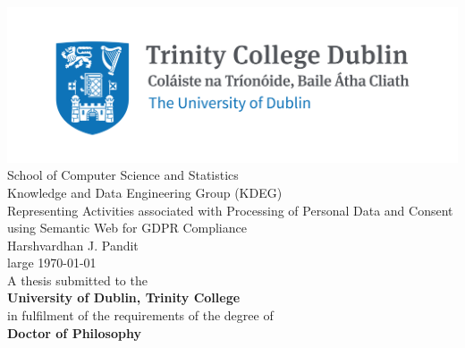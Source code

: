 \pagestyle{empty}
\begin{center}
\includegraphics{img/TCD_logo.png}\\[1cm] 
\Large School of Computer Science and Statistics \\
\large Knowledge and Data Engineering Group (KDEG) \\[1.5cm]

\huge Representing Activities associated with Processing of Personal Data and Consent using Semantic Web for GDPR Compliance \\[1.5cm]
 
\Large Harshvardhan J. Pandit \\[2cm]

{large \today}\\[2cm] %

\normalsize
A thesis submitted to the \\
\textbf{University of Dublin, Trinity College} \\
in fulfilment of the requirements of the degree of \\
\textbf{Doctor of Philosophy}

\normalsize

\vfill %
\end{center}
\restoregeometry